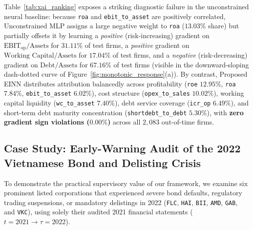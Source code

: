 \documentclass[11pt,a4paper]{article}
\begin{document}
Table~\ref{tab:xai_ranking} exposes a striking diagnostic failure in the unconstrained neural baseline: because \texttt{roa} and \texttt{ebit\_to\_asset} are positively correlated, Unconstrained MLP assigns a large negative weight to \texttt{roa} ($13.03\%$ share) but partially offsets it by learning a \textit{positive} (risk-increasing) gradient on $\text{EBIT}_{\text{op}}/\text{Assets}$ for $31.11\%$ of test firms, a \textit{positive} gradient on $\text{Working Capital}/\text{Assets}$ for $17.04\%$ of test firms, and a \textit{negative} (risk-decreasing) gradient on $\text{Debt}/\text{Assets}$ for $67.16\%$ of test firms (visible in the downward-sloping dash-dotted curve of Figure~\ref{fig:monotonic_response}(a)). By contrast, Proposed EINN distributes attribution balancedly across profitability (\texttt{roe} $12.95\%$, \texttt{roa} $7.84\%$, \texttt{ebit\_to\_asset} $6.02\%$), cost structure (\texttt{opex\_to\_sales} $10.02\%$), working capital liquidity (\texttt{wc\_to\_asset} $7.40\%$), debt service coverage (\texttt{icr\_op} $6.49\%$), and short-term debt maturity concentration (\texttt{shortdebt\_to\_debt} $5.30\%$), with \textbf{zero gradient sign violations ($0.00\%$)} across all $2,083$ out-of-time firms.

\subsection{Case Study: Early-Warning Audit of the 2022 Vietnamese Bond and Delisting Crisis}
To demonstrate the practical supervisory value of our framework, we examine six prominent listed corporations that experienced severe bond defaults, regulatory trading suspensions, or mandatory delistings in 2022 (\texttt{FLC}, \texttt{HAI}, \texttt{BII}, \texttt{AMD}, \texttt{GAB}, and \texttt{VKC}), using solely their audited 2021 financial statements ($t=2021 \to \tau=2022$).
\end{document}
